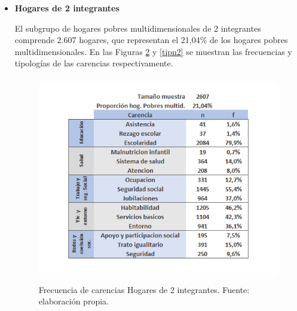 \documentclass[12pt,letterpaper,spanish]{article}
\begin{document}
\begin{itemize}
\begin{figure}[H]
        \caption{Tipologías más frecuentes Hogares de 1 integrante. Fuente: elaboración propia.}
        \label{tipn1}
    \end{figure}
    Escolaridad es la carencia más presente en los hogares unipersonales con una frecuencia de 74,2\%. Habitabilidad, Servicios básicos y Entorno, todas pertenecientes a la dimensión Vivienda y entorno, son las otras carencias más frecuentes. La carencia Malnutrición infantil no se encuentra presente en ningún hogar, y las carencias Asistencia Escolar y Rezago Escolar son las carencias menos presentes en los hogares, con frecuencias de 0,2\% y 0,1\% respectivamente. Esto resulta previsible debido a la definición de este tipo de hogar (hogares conformados por un solo integrante), ya que se espera que las personas que viven solas sean adultas.

    Los hogares de 1 integrante pobres multidimensionales presentan 259 tipologías de carencias. Dentro de las 10 tipologías más frecuentes, que representan el 47,51\% del subgrupo, se destaca la inexistencia de privaciones en las dimensiones de Salud y Redes y cohesión social, y la alta incidencia de Escolaridad y las carencias de la dimensión Vivienda y entorno.
    
    \item \textbf{Hogares de 2 integrantes}
    
    El subgrupo de hogares pobres multidimensionales de 2 integrantes comprende 2.607 hogares, que representan el 21,04\% de los hogares pobres multidimensionales. En las Figuras \ref{fren2} y \ref{tipn2} se muestran las frecuencias y tipologías de las carencias respectivamente. 
    \begin{figure}[H]
        \centering
        \includegraphics[height=9cm]{HOGARES/tabla_num2.png}
        \caption{Frecuencia de carencias Hogares de 2 integrantes. Fuente: elaboración propia.}
        \label{fren2}
    \end{figure}


\end{itemize}
\end{document}

